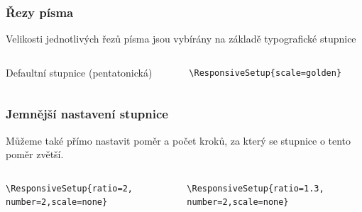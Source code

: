\begin{frame}[fragile]
  \frametitle{Řezy písma}

  Velikosti jednotlivých řezů písma jsou vybírány na základě typografické stupnice

\begin{columns}
  \begin{column}{0.5\textwidth}
Defaultní stupnice (pentatonická)
\end{column}
  \begin{column}{0.5\textwidth}
\begin{verbatim}
\ResponsiveSetup{scale=golden}
\end{verbatim}
\end{column}
\end{columns}

\end{frame}

\begin{frame}[fragile]
  \frametitle{Jemnější nastavení stupnice}

  Můžeme také přímo nastavit poměr a počet kroků, za který se stupnice o tento poměr zvětší.

\begin{columns}
  \begin{column}{0.5\textwidth}
\begin{verbatim}
\ResponsiveSetup{ratio=2,
number=2,scale=none}
\end{verbatim}
\end{column}
  \begin{column}{0.5\textwidth}
\begin{verbatim}
\ResponsiveSetup{ratio=1.3,
number=2,scale=none}
\end{verbatim}
\end{column}
\end{columns}

\end{frame}

